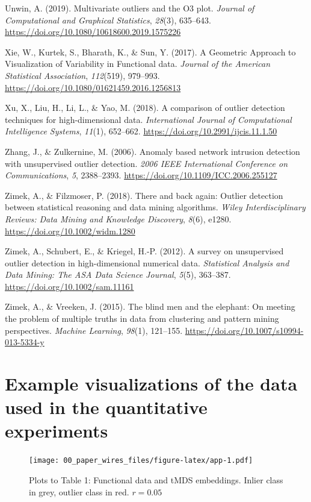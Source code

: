 \documentclass[
  10pt]{article}
\newlength{\cslhangindent}
\newlength{\cslentryspacingunit} %
\newenvironment{CSLReferences}[2] %
 {%
  \setlength{\parindent}{0pt}
  \ifodd #1
  \let\oldpar\par
  \def\par{\hangindent=\cslhangindent\oldpar}
  \fi
  \setlength{\parskip}{#2\cslentryspacingunit}
 }%
 {}
\begin{document}
\begin{CSLReferences}{1}{0}
\leavevmode{}%
Unwin, A. (2019). Multivariate outliers and the {O}3 plot. \emph{Journal of Computational and Graphical Statistics}, \emph{28}(3), 635--643. \url{https://doi.org/10.1080/10618600.2019.1575226}

\leavevmode{}%
Xie, W., Kurtek, S., Bharath, K., \& Sun, Y. (2017). A {G}eometric {A}pproach to {V}isualization of {V}ariability in {F}unctional data. \emph{Journal of the American Statistical Association}, \emph{112}(519), 979--993. \url{https://doi.org/10.1080/01621459.2016.1256813}

\leavevmode{}%
Xu, X., Liu, H., Li, L., \& Yao, M. (2018). A comparison of outlier detection techniques for high-dimensional data. \emph{International Journal of Computational Intelligence Systems}, \emph{11}(1), 652--662. \url{https://doi.org/10.2991/ijcis.11.1.50}

\leavevmode{}%
Zhang, J., \& Zulkernine, M. (2006). Anomaly based network intrusion detection with unsupervised outlier detection. \emph{2006 IEEE International Conference on Communications}, \emph{5}, 2388--2393. \url{https://doi.org/10.1109/ICC.2006.255127}

\leavevmode{}%
Zimek, A., \& Filzmoser, P. (2018). There and back again: Outlier detection between statistical reasoning and data mining algorithms. \emph{Wiley Interdisciplinary Reviews: Data Mining and Knowledge Discovery}, \emph{8}(6), e1280. \url{https://doi.org/10.1002/widm.1280}

\leavevmode{}%
Zimek, A., Schubert, E., \& Kriegel, H.-P. (2012). A survey on unsupervised outlier detection in high-dimensional numerical data. \emph{Statistical Analysis and Data Mining: The ASA Data Science Journal}, \emph{5}(5), 363--387. \url{https://doi.org/10.1002/sam.11161}

\leavevmode{}%
Zimek, A., \& Vreeken, J. (2015). The blind men and the elephant: On meeting the problem of multiple truths in data from clustering and pattern mining perspectives. \emph{Machine Learning}, \emph{98}(1), 121--155. \url{https://doi.org/10.1007/s10994-013-5334-y}

\end{CSLReferences}

\newpage

\appendix

\hypertarget{sec:app}{%
\section{Example visualizations of the data used in the quantitative experiments}\label{sec:app}}

\begin{figure}
\centering
\texttt{[image: 00\_paper\_wires\_files/figure-latex/app-1.pdf]}
\caption{\label{fig:app}\label{fig:app} Plots to Table 1: Functional data and tMDS embeddings. Inlier class in grey, outlier class in red. \(r = 0.05\)}
\end{figure}
\end{document}
